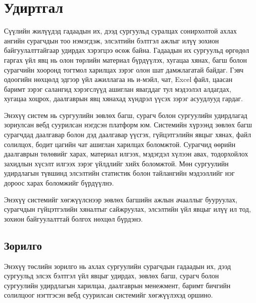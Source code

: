 {}
\label{Introduction}

\section*{Удиртгал}

Сүүлийн жилүүдэд гадаадын их, дээд сургуульд суралцах сонирхолтой ахлах ангийн сурагчдын тоо нэмэгдэж, элсэлтийн бэлтгэл ажлыг илүү зохион байгуулалттайгаар удирдах хэрэгцээ өсөж байна. Гадаадын их сургуульд өргөдөл гаргах үйл явц нь олон төрлийн материал бүрдүүлэх, хугацаа хянах, багш болон сурагчийн хооронд тогтмол харилцах зэрэг олон шат дамжлагатай байдаг. Гэвч одоогийн нөхцөлд эдгээр үйл ажиллагаа нь и-мэйл, чат, Excel файл, цаасан баримт зэрэг салангид хэрэгслүүд ашиглан явагддаг тул мэдээлэл алдагдах, хугацаа хоцрох, даалгаврын явц хянахад хүндрэл үүсэх зэрэг асуудлууд гардаг.

Энэхүү систем нь сургуулийн зөвлөх багш, сурагч болон сургуулийн удирдлагад зориулсан вебд суурилсан нэгдсэн платформ юм. Системийн хүрээнд зөвлөх багш сурагчдад даалгавар болон дэд даалгавар үүсгэх, гүйцэтгэлийн явцыг хянах, файл солилцох, бодит цагийн чат ашиглан харилцах боломжтой. Сурагчид өөрийн даалгаврын төлөвийг харах, материал илгээх, мэдэгдэл хүлээн авах, тодорхойлох захидлын хүсэлт илгээх зэрэг үйлдлийг хийх боломжтой. Мөн сургуулийн удирдлагын түвшинд элсэлтийн статистик болон тайлангийн мэдээллийг нэг дороос харах боломжийг бүрдүүлнэ.

Энэхүү системийг хөгжүүлснээр зөвлөх багшийн ажлын ачааллыг бууруулах, сурагчдын гүйцэтгэлийн хяналтыг сайжруулах, элсэлтийн үйл явцыг илүү ил тод, зохион байгуулалттай болгох нөхцөл бүрдэнэ.
\subsection*{Зорилго}
Энэхүү төслийн зорилго нь ахлах сургуулийн сурагчдын гадаадын их, дээд сургуульд элсэх бэлтгэл үйл явцыг удирдах, зөвлөх багш, сурагч болон сургуулийн удирдлагын харилцаа, даалгаврын менежмент, баримт бичгийн солилцоог нэгтгэсэн вебд суурилсан системийг хөгжүүлэхэд оршино.

